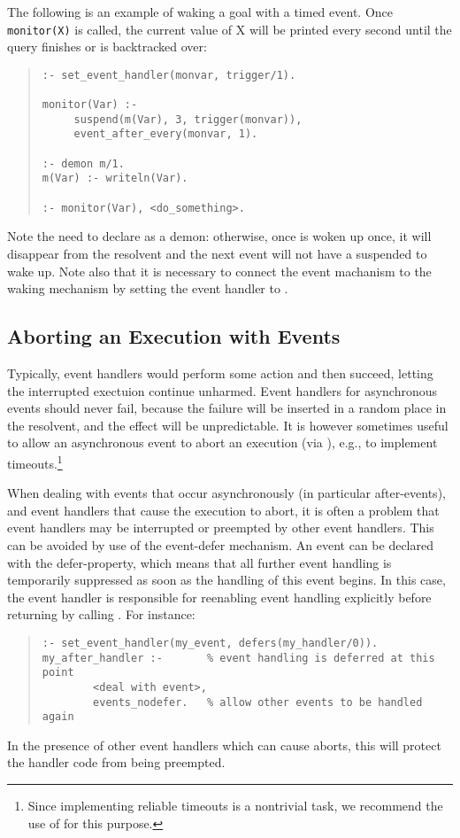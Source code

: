 The following is an example of waking a goal with a timed event.
Once \verb+monitor(X)+ is called, the current value of X will be
printed every second until the query finishes or is backtracked over:
\begin{quote}
\begin{verbatim}
:- set_event_handler(monvar, trigger/1).

monitor(Var) :-
     suspend(m(Var), 3, trigger(monvar)),
     event_after_every(monvar, 1).

:- demon m/1.
m(Var) :- writeln(Var).

:- monitor(Var), <do_something>.
\end{verbatim}
\end{quote}
Note the need to declare
 as a demon: otherwise, once  is woken up once, it
will
disappear from the resolvent and the next  event will not have
a suspended  to wake up.
Note also that it is necessary to connect the event machanism to
the waking mechanism by setting the event handler to
.


\subsection{Aborting an Execution with Events}

Typically, event handlers would perform some action and then succeed,
letting the interrupted exectuion continue unharmed. Event handlers for
asynchronous events should never fail, because the failure will be inserted
in a random place in the resolvent, and the effect will be unpredictable.
It is however sometimes useful to allow an asynchronous event to abort
an execution (via
), e.g.,
to implement timeouts.\footnote{%
  Since implementing reliable timeouts is a
  nontrivial task, we recommend the use of
   for this purpose.}

When dealing with events that occur asynchronously (in particular after-events),
and event handlers that cause the execution to abort, it is often a problem
that event handlers may be interrupted or preempted by other event handlers.
This can be avoided by use of the event-defer mechanism. An event can be
declared with the defer-property, which means that all further event handling
is temporarily suppressed as soon as the handling of this event begins.
In this case, the event handler is responsible for reenabling event handling
explicitly before returning by calling
.
For instance:
\begin{quote}
\begin{verbatim}
:- set_event_handler(my_event, defers(my_handler/0)).
my_after_handler :-       % event handling is deferred at this point
        <deal with event>,
        events_nodefer.   % allow other events to be handled again
\end{verbatim}
\end{quote}
In the presence of other event handlers which can cause aborts, this will
protect the handler code from being preempted.


